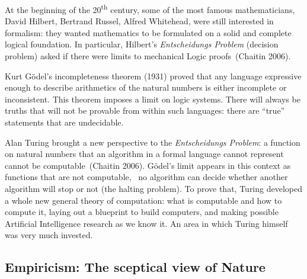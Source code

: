 \documentclass[
  letterpaper,
  12pt,
  british]{tufte-book}
\theoremstyle{plain}
\theoremstyle{plain}
\theoremstyle{definition}
\theoremstyle{remark}
\begin{document}
At the beginning of the 20\textsuperscript{th} century, some of the most
famous mathematicians, David Hilbert, Bertrand Russel, Alfred Whitehead,
were still interested in formalism: they wanted mathematics to be
formulated on a solid and complete logical foundation. In particular,
Hilbert's \emph{Entscheidungs Problem} (decision problem) asked if there
were limits to mechanical Logic proofs~(Chaitin
2006).

Kurt Gödel's incompleteness theorem (1931) proved that any language
expressive enough to describe arithmetics of the natural numbers is
either incomplete or inconsistent. This theorem imposes a limit on logic
systems. There will always be truths that will not be provable from
within such languages: there are ``true'' statements that are
undecidable.

Alan Turing brought a new perspective to the \emph{Entscheidungs
Problem}: a function on natural numbers that an algorithm in a formal
language cannot represent cannot be computable~(Chaitin
2006).
Gödel's limit appears in this context as functions that are not
computable, ~no algorithm can decide whether another algorithm will stop
or not (the halting problem). To prove that, Turing developed a whole
new general theory of computation: what is computable and how to compute
it, laying out a blueprint to build computers, and making possible
Artificial Intelligence research as we know it. An area in which Turing
himself was very much invested.

\hypertarget{sec-empiricism}{%
\subsection{Empiricism: The sceptical view of
Nature}\label{sec-empiricism}}
\end{document}
